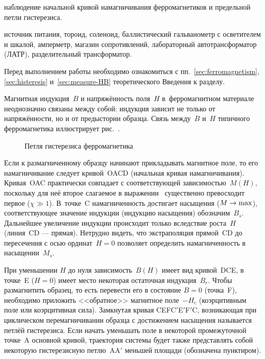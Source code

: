 \label{lab:4-4}

\begin{lab:aim}
	наблюдение начальной кривой намагничивания ферромагнетиков 
    и предельной петли гистерезиса.
\end{lab:aim}

\begin{lab:equipment}
	источник питания, тороид, соленоид, баллистический гальванометр с
осветителем и шкалой,
	амперметр, магазин сопротивлений, лабораторный автотрансформатор (ЛАТР),
разделительный трансформатор.
\end{lab:equipment}

Перед выполнением работы необходимо ознакомиться с
пп.~\ref{sec:ferromagnetism}, \ref{sec:histeresis} и~\ref{sec:measure-HB} 
теоретического Введения к разделу.

Магнитная индукция~${B}$ и напряжённость поля~${H}$
в~ферромагнитном материале неоднозначно связаны между
собой: индукция зависит не только от напряжённости, но и от предыстории образца.
Связь между~$B$ и~$H$ типичного ферромагнетика иллюстрирует
рис.~.

\begin{figure}[h]
    \centering
    \caption{Петля гистерезиса ферромагнетика}
\end{figure}

Если к размагниченному образцу начинают прикладывать магнитное поле,
то его намагничивание следует кривой~OACD (начальная кривая намагничивания).
Кривая~OAC практически совпадает с соответствующей зависимостью~$M(H)$,
поскольку для неё второе слагаемое в выражении~
существенно превосходит первое ($\chi\gg1$). В~точке~C намагниченность
достигает насыщения ($M\to \rm max$), соответствующее значение
индукции (индукцию насыщения) обозначим~$B_s$.
Дальнейшее увеличение индукции происходит только вследствие
роста~$H$ (линия~CD --- прямая). Нетрудно видеть, что экстраполяция прямой~CD 
до пересечения с осью ординат~$H=0$ позволяет определить намагниченность 
в насыщении~$M_s$.

При уменьшении $H$ до нуля зависимость~$B(H)$ имеет вид
кривой~DCE, в точке~E ($H=0$) имеет место некоторая остаточная индукция~$B_r$.
Чтобы размагнитить образец, то есть перевести
его в состояние $B=0$ (точка~F), необходимо приложить <<обратное>> магнитное поле~$-H_c$
(коэрцитивным поле или коэрцитивная сила).
Замкнутая кривая CEFC$'$E$'$F$'$C, возникающая при циклическом перемагничивании
образца с достижением насыщения
называется  петлёй гистерезиса. Если начать уменьшать поле
в некоторой промежуточной точке~A основной кривой, траектория
системы будет также представлять собой некоторую гистерезисную петлю~AA$'$
меньшей площади (обозначена пунктиром).

